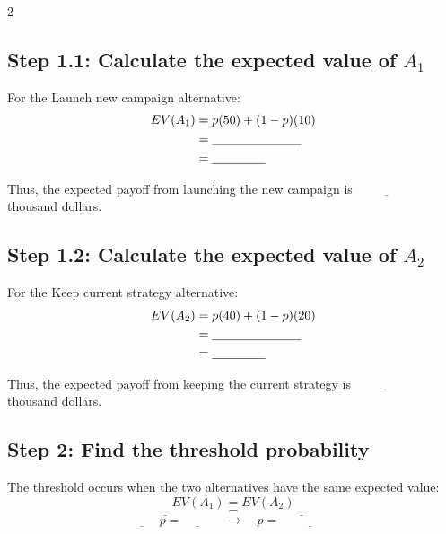 \begin{multicols}{2}
	\vspace{-4mm}
	
	\columnbreak
	
	\subsection*{Step 1.1: Calculate the expected value of $A_1$}
	
	For the Launch new campaign alternative:
	\[
	\begin{aligned}
		EV(A_1)
		&=
		p(50)+(1-p)(10)
		\\
		&=
		\underline{\hspace{2.5cm}}
		\\
		&=
		\underline{\hspace{1.5cm}}
	\end{aligned}
	\]
	
	Thus, the expected payoff from launching the new campaign is
	$\underline{\hspace{2cm}}$ thousand dollars.
	
	\subsection*{Step 1.2: Calculate the expected value of $A_2$}
	
	For the Keep current strategy alternative:
	\[
	\begin{aligned}
		EV(A_2)
		&=
		p(40)+(1-p)(20)
		\\
		&=
		\underline{\hspace{2.5cm}}
		\\
		&=
		\underline{\hspace{1.5cm}}
	\end{aligned}
	\]
	
	Thus, the expected payoff from keeping the current strategy is
	$\underline{\hspace{2cm}}$ thousand dollars.
	
	\subsection*{Step 2: Find the threshold probability}
	
	The threshold occurs when the two alternatives have the same expected
	value:
	\[
	EV(A_1)=EV(A_2)
	\]
	\[
	\underline{\hspace{4cm}}
	=
	\underline{\hspace{4cm}}
	\]
	\[
	\underline{\hspace{1cm}} \>p
	=
	\underline{\hspace{1cm}}
	\quad \longrightarrow \quad 
	p
	=
	\underline{\hspace{2cm}}
	\]
	

\end{multicols}
